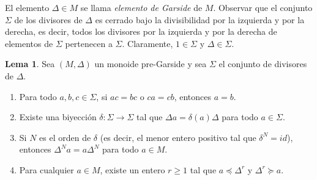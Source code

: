 \documentclass[12pt]{book}
\theoremstyle{definition}
\newtheorem{lema}{Lema}[section]
\begin{document}
El elemento $\Delta\in M$ se llama \textit{elemento de Garside} de $M$. Observar que el conjunto $\Sigma$ de los divisores de $\Delta$ es cerrado bajo la divisibilidad por la izquierda y por la derecha, es decir, todos los divisores por la izquierda y por la derecha de elementos de $\Sigma$ pertenecen a $\Sigma$. Claramente, $1\in\Sigma$ y $\Delta\in\Sigma$.

\begin{lema}
Sea $(M,\Delta)$ un monoide pre-Garside y sea $\Sigma$ el conjunto de divisores de $\Delta$.

\begin{enumerate}[label=(\roman*).]
\item Para todo $a,b,c\in\Sigma$, si $ac=bc$ o $ca=cb$, entonces $a=b$.
\item Existe una biyección $\delta:\Sigma\rightarrow \Sigma$ tal que $\Delta a=\delta(a)\Delta$ para todo $a\in\Sigma$.
\item Si $N$ es el orden de $\delta$ (es decir, el menor entero positivo tal que $\delta^{N}=id$), entonces $\Delta^N a=a\Delta^N$ para todo $a\in M$.
\item Para cualquier $a\in M$, existe un entero $r\geq 1$ tal que $a\preceq\Delta^r$ y $\Delta^r\succeq a$.
\end{enumerate}
\label{lema:pre-garside}
\end{lema}
\end{document}
